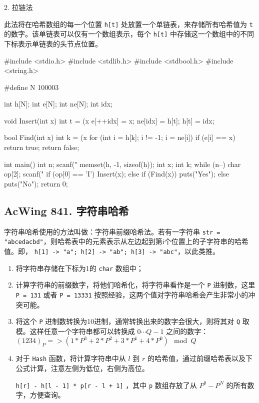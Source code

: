 2. 拉链法

此法将在哈希数组的每一个位置 \lstinline{h[t]} 处放置一个单链表，来存储所有哈希值为 \lstinline{t} 的数字。该单链表可以仅有一个数组表示，每个 \lstinline{h[t]} 中存储这一个数组中的不同下标表示单链表的头节点位置。

\begin{mycpptwocol}[拉链法]
#include <stdio.h>
#include <stdlib.h>
#include <stdbool.h>
#include <string.h>

#define N 100003

int h[N];
int e[N];
int ne[N];
int idx;

void Insert(int x)
{
    int t = (x %
    e[++idx] = x;
    ne[idx] = h[t];
    h[t] = idx;
}

bool Find(int x)
{
    int k = (x %
    for (int i = h[k]; i != -1; i = ne[i]) {
        if (e[i] == x) {
            return true;
        }
    }
    return false;
}

int main()
{
    int n;
    scanf("%
    memset(h, -1, sizeof(h));
    int x;
    int k;
    while (n--) {
        char op[2];
        scanf("%
        if (op[0] == 'I') {
            Insert(x);
        } else {
            if (Find(x)) {
                puts("Yes");
            } else {
                puts("No");
            }
        }
    }
    return 0;
}
\end{mycpptwocol}

\subsection{AcWing 841. 字符串哈希}

字符串哈希使用的方法叫做：字符串前缀哈希法。若有一字符串 \lstinline{str = "abcedacbd"}，则哈希表中的元素表示从左边起到第i个位置上的子字符串的哈希值。即， \lstinline{h[1] -> "a"; h[2] -> "ab"; h[3] -> "abc"}，以此类推。

\begin{enumerate}
    \item 将字符串存储在下标为1的 \lstinline{char} 数组中；
    \item 计算字符串的前缀数字，将他们哈希化，将字符串看作是一个 \lstinline{P} 进制数，这里 \lstinline{P = 131} 或者 \lstinline{P = 13331} 按照经验，这两个值对字符串哈希会产生非常小的冲突可能。
    \item 将这个 \lstinline{P} 进制数转换为10进制，通常转换出来的数字会很大，则将其对 \lstinline{Q} 取模。这样任意一个字符串都可以转换成 $0 \cdots Q - 1$ 之间的数字：$(1234)_P => (1 * P^3 + 2 * P^2 + 3 * P^1 + 4 * P^0) \mod Q$
    \item 对于 \lstinline{Hash} 函数，将计算字符串中从 $l$ 到 $r$ 的哈希值，通过前缀哈希表以及下公式计算，注意左侧为低位，右侧为高位。
    
    \lstinline{h[r] - h[l - 1] * p[r - l + 1]} ，其中 \lstinline{p} 数组存放了从 $P^0 - P^N$ 的所有数字，方便查询。
\end{enumerate}

